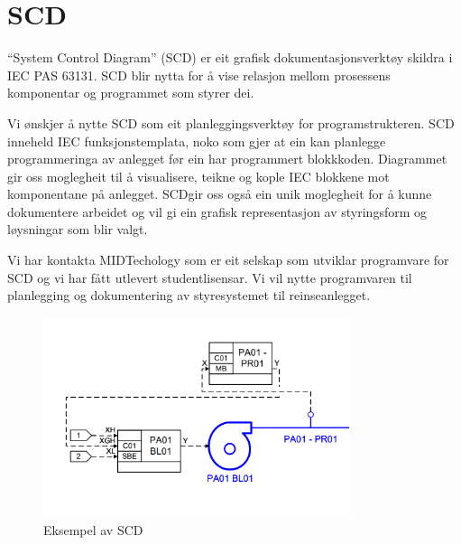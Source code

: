 \section{SCD}
\thispagestyle{fancy}


``System Control Diagram'' (\gls{SCD})  er eit grafisk dokumentasjonsverktøy skildra i \gls{IEC} \gls{PAS} 63131.\newline
 \gls{SCD} blir nytta for å vise relasjon mellom prosessens komponentar og programmet som styrer dei.
 
 Vi ønskjer å nytte \gls{SCD} som eit planleggingsverktøy for programstrukteren. \gls{SCD} inneheld \gls{IEC} funksjonstemplata, noko som gjer at ein kan
 planlegge programmeringa av anlegget før ein har programmert blokkkoden.
 Diagrammet gir oss moglegheit til å visualisere, teikne og kople \gls{IEC} blokkene mot komponentane på anlegget.
 \gls{SCD}gir oss også ein unik moglegheit for å kunne dokumentere arbeidet og vil gi ein grafisk representasjon
 av styringsform og løysningar som blir valgt.

 Vi har kontakta MIDTechology \citep{MIDT} som er eit selskap som utviklar programvare for \gls{SCD} og vi har fått utlevert studentlisensar. 
 Vi vil nytte programvaren til planlegging og dokumentering av styresystemet til reinseanlegget. \newline \newline \newline

 \begin{figure}[htbp]
    \centering
    \includegraphics[width=0.8\textwidth]{Bilder/Visio_eksempel.png}
    \caption{Eksempel av \gls{SCD}}\label{fig:SCD eksempel}    
\end{figure}

\newpage